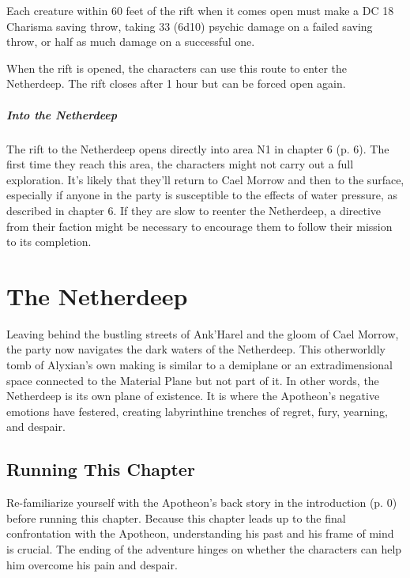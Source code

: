 \documentclass[letterpaper, 11pt, bg=full, twocolumn]{dndbook}
\begin{document}
Each creature within 60 feet of the rift when it comes open must make a DC 18 Charisma saving throw, taking 33 (6d10) psychic damage on a failed saving throw, or half as much damage on a successful one.

When the rift is opened, the characters can use this route to enter the Netherdeep. The rift closes after 1 hour but can be forced open again.

\paragraph{Into the Netherdeep}

The rift to the Netherdeep opens directly into area N1 in chapter 6 (p. 6). The first time they reach this area, the characters might not carry out a full exploration. It's likely that they'll return to Cael Morrow and then to the surface, especially if anyone in the party is susceptible to the effects of water pressure, as described in chapter 6. If they are slow to reenter the Netherdeep, a directive from their faction might be necessary to encourage them to follow their mission to its completion.

\chapter{The Netherdeep}\label{ch:the-netherdeep-7-7}

Leaving behind the bustling streets of Ank'Harel and the gloom of Cael Morrow, the party now navigates the dark waters of the Netherdeep. This otherworldly tomb of Alyxian's own making is similar to a demiplane or an extradimensional space connected to the Material Plane but not part of it. In other words, the Netherdeep is its own plane of existence. It is where the Apotheon's negative emotions have festered, creating labyrinthine trenches of regret, fury, yearning, and despair.
\section{Running This Chapter}

Re-familiarize yourself with the Apotheon's back story in the introduction (p. 0) before running this chapter. Because this chapter leads up to the final confrontation with the Apotheon, understanding his past and his frame of mind is crucial. The ending of the adventure hinges on whether the characters can help him overcome his pain and despair.
\end{document}
